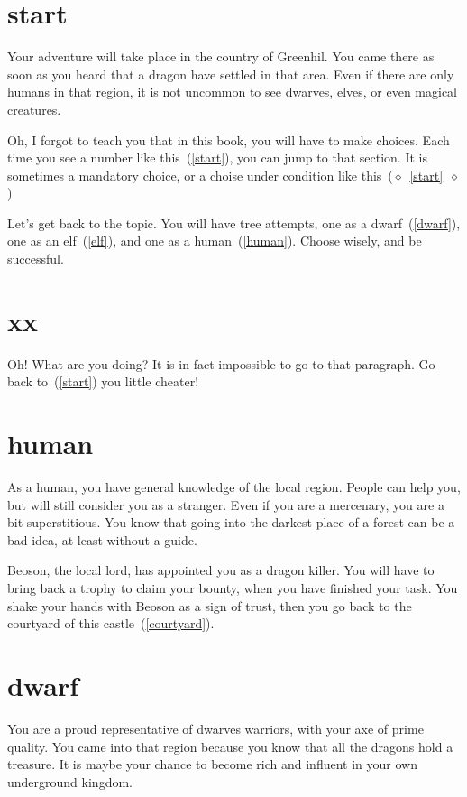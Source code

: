 \section{start}

Your adventure will take place in the country of Greenhil. You came there as soon
as you heard that a dragon have settled in that area. Even if there are only
humans in that region, it is not uncommon to see dwarves, elves, or even magical
creatures.

Oh, I forgot to teach you that in this book, you will have to make choices. Each
time you see a number like this~(\ref{start}), you can jump to that section.
It is sometimes a mandatory choice, or a choise under condition
like this~($\diamond$~\ref{start}~$\diamond$)

Let's get back to the topic. You will have tree attempts, one as a
dwarf~(\ref{dwarf}), one as an elf~(\ref{elf}), and one as a
human~(\ref{human}). Choose wisely, and be successful.

\section{xx}

Oh! What are you doing? It is in fact impossible to go to that paragraph. Go back
to~(\ref{start}) you little cheater!

\section{human}

As a human, you have general knowledge of the local region. People can help
you, but will still consider you as a stranger. Even if you are a mercenary, you
are a bit superstitious. You know that going into the darkest place of a forest
can be a bad idea, at least without a guide.

Beoson, the local lord, has appointed you as a dragon killer. You will have to bring
back a trophy to claim your bounty, when you have finished your task. You shake
your hands with Beoson as a sign of trust, then you go back to the courtyard of
this castle~(\ref{courtyard}).

\section{dwarf}

You are a proud representative of dwarves warriors, with your axe of prime
quality. You came into that region because you know that all the dragons hold a
treasure. It is maybe your chance to become rich and influent in your own
underground kingdom.

